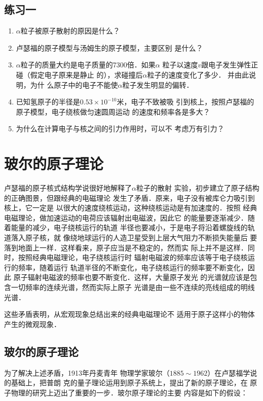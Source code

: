 \subsection*{练习一}
\begin{enumerate}
    \item $\alpha$粒子被原子散射的原因是什么？
    \item 卢瑟福的原子模型与汤姆生的原子模型，主要区别
    是什么？
    \item $\alpha$粒子的质量大约是电子质量的7300倍．如果$\alpha$
    粒子以速度$v$跟电子发生弹性正碰（假定电子原来是静止
    的），求碰撞后$\alpha$粒子的速度变化了多少．
    并由此说明，为什
    么原子中的电子不能使$\alpha$粒子发生明显的偏转．
    \item 已知氢原子的半径是$0.53\times10^{-10}$米，电子不致被吸
    引到核上，按照卢瑟福的原子模型，电子绕核做匀速圆周运动
    的速度和频率各是多大？
    \item 为什么在计算电子与核之间的引力作用时，可以不
    考虑万有引力？

\end{enumerate}

\section{玻尔的原子理论}\label{sec_C_8-3}
卢瑟福的原子核式结构学说很好地解释了$\alpha$粒子的散射
实验，初步建立了原子结构的正确图景，但跟经典的电磁理论
发生了矛盾．原来，电子没有被库仑力吸引到核上，它一定是
以很大的速度绕核运动，这种绕核运动是有加速度的．按照
经典电磁理论，做加速运动的电荷应该辐射出电磁波，因此它
的能量要逐渐减少．随着能量的减少，电子绕核运行的轨道
半径也要减小，于是电子将沿着螺旋线的轨道落入原子核，就
像绕地球运行的人造卫星受到上层大气阻力不断损失能量后
要落到地面上一样．这样看来，原子应当是不稳定的，然而实
际上并不是这样．同时，按照经典电磁理论，电子绕核运行时
辐射电磁波的频率应该等于电子绕核运行的频率，随着运行
轨道半径的不断变化，电子绕核运行的频率要不断变化，因此
原子辐射电磁波的频率也要不断变化．这样，大量原子发光
的光谱就应该是包含一切频率的连续光谱，然而实际上原子
光谱是由一些不连续的亮线组成的明线光谱．

这些矛盾表明，从宏观现象总结出来的经典电磁理论不
适用于原子这样小的物体产生的微观现象．

\subsection{玻尔的原子理论} 

为了解决上述矛盾，1913年丹麦青年
物理学家玻尔（$1885 \sim 1962$）在卢瑟福学说的基础上，把普朗
克的量子理论运用到原子系统上，提出了新的原子理论，在
原子物理的研究上迈出了重要的一步．玻尔原子理论的主要
内容是如下的假设：

